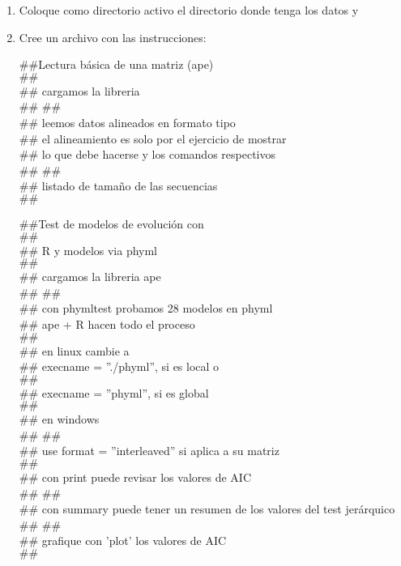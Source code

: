{\begin{enumerate}
	\item Coloque como directorio activo el directorio donde tenga los datos y 
	
	\item Cree un archivo con las instrucciones:

$\#\#${Lectura b\'asica de una matriz (ape)}\\
$\#\#$
\\$\#\#$ cargamos la libreria 
\\$\#\#$
$\#\#$
\\$\#\#$ leemos datos alineados en formato tipo 
\\$\#\#$ el alineamiento es solo por el ejercicio de mostrar
\\$\#\#$ lo que debe hacerse y los comandos respectivos
\\$\#\#$
$\#\#$
\\$\#\#$ listado de tama\~no de las secuencias
\\$\#\#$

$\#\#${Test de modelos de evoluci\'on con }\\
\label{sec:phytest}
$\#\#$
\\$\#\#$ R y modelos via phyml 
\\$\#\#$
\\$\#\#$ cargamos la libreria ape
\\$\#\#$
$\#\#$
\\$\#\#$  con phymltest probamos 28 modelos en phyml
\\$\#\#$  ape + R hacen todo el proceso
\\$\#\#$
\\$\#\#$  en linux cambie a
\\$\#\#$  execname = ''./phyml'', si es local o
\\$\#\#$
\\$\#\#$  execname = ''phyml'', si es global
\\$\#\#$
\\$\#\#$ en windows
\\$\#\#$
  $\#\#$  
\\$\#\#$  use format = ''interleaved'' si aplica a su matriz 
\\$\#\#$ 
\\$\#\#$ con print puede revisar los valores de AIC
\\$\#\#$
$\#\#$ 
\\$\#\#$  con summary puede tener un resumen de los valores del test jer\'arquico
\\$\#\#$ 
$\#\#$ 
\\$\#\#$ grafique con 'plot' los valores de AIC
\\$\#\#$ 


\end{enumerate}}
